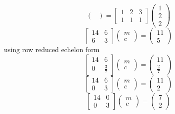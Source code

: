 \documentclass[a4paper,11pt]{article}
\numberwithin{equation}{section}
\begin{document}
\begin{itemize}
\begin{center}
\[\begin{pmatrix}
    \end{pmatrix}=
    \begin{bmatrix}
        1&2&3\\1&1&1
    \end{bmatrix}
    \begin{pmatrix}
        1\\2\\2
    \end{pmatrix}
    \]
    \[
    \begin{bmatrix}
        14&6\\6&3
    \end{bmatrix}
    \begin{pmatrix}
        m\\c
    \end{pmatrix}=
    \begin{pmatrix}
        11\\5
    \end{pmatrix}
    \]
    using row reduced echelon form
    \[
    \begin{bmatrix}
        14&6\\0&\frac{3}{7}
    \end{bmatrix}
    \begin{pmatrix}
        m\\c
    \end{pmatrix}=
    \begin{pmatrix}
        11\\\frac{2}{7}
    \end{pmatrix}
    \]
    \[
    \begin{bmatrix}
        14&6\\0&3
    \end{bmatrix}
    \begin{pmatrix}
        m\\c
    \end{pmatrix}=
    \begin{pmatrix}
        11\\2
    \end{pmatrix}
    \]
    \[
    \begin{bmatrix}
        14&0\\0&3
    \end{bmatrix}
    \begin{pmatrix}
        m\\c
    \end{pmatrix}=
    \begin{pmatrix}
        7\\2
    \end{pmatrix}
    \]
\end{center}


\end{itemize}
\end{document}
